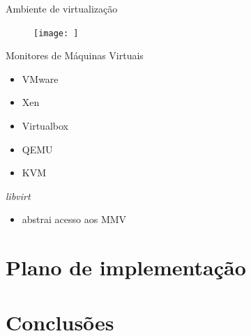 \documentclass{beamer}
\begin{document}
\begin{frame}{Ambiente de virtualização}
\begin{figure}
\centering
%
%
\texttt{[image: ]}
\end{figure}
\end{frame}

\begin{frame}{Monitores de Máquinas Virtuais}
\begin{itemize}
  \item VMware
  \item Xen
  \item Virtualbox
  \item QEMU
  \item KVM
\end{itemize}
\end{frame}

\begin{frame}{\emph{libvirt}}
\begin{itemize}
  \item abstrai acesso aos MMV
\end{itemize}
\end{frame}

\section{Plano de implementação}

\section{Conclusões}
\end{document}
